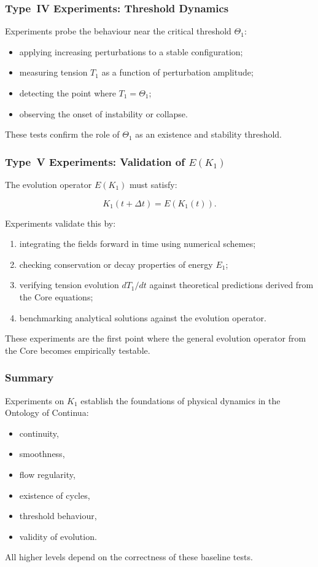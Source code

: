 \subsubsection{Type~IV Experiments: Threshold Dynamics}

Experiments probe the behaviour near the critical threshold $\Theta_1$:

\begin{itemize}
    \item applying increasing perturbations to a stable configuration;
    \item measuring tension $T_1$ as a function of perturbation amplitude;
    \item detecting the point where $T_1 = \Theta_1$;
    \item observing the onset of instability or collapse.
\end{itemize}

These tests confirm the role of $\Theta_1$ as an existence and stability
threshold.


\subsubsection{Type~V Experiments: Validation of \texorpdfstring{$E(K_1)$}{E(K_1)}}

The evolution operator $E(K_1)$ must satisfy:

\[
    K_1(t+\Delta t) = E(K_1(t)).
\]

Experiments validate this by:

\begin{enumerate}
    \item integrating the fields forward in time using numerical schemes;
    \item checking conservation or decay properties of energy $E_1$;
    \item verifying tension evolution $dT_1/dt$ against theoretical
          predictions derived from the Core equations;
    \item benchmarking analytical solutions against the evolution operator.
\end{enumerate}

These experiments are the first point where the general evolution operator
from the Core becomes empirically testable.


\subsubsection{Summary}

Experiments on $K_1$ establish the foundations of physical dynamics in the
Ontology of Continua:

\begin{itemize}
    \item continuity,
    \item smoothness,
    \item flow regularity,
    \item existence of cycles,
    \item threshold behaviour,
    \item validity of evolution.
\end{itemize}

All higher levels depend on the correctness of these baseline tests.
